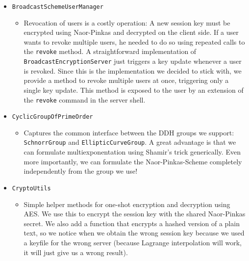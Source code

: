 \documentclass[a4paper,10pt]{scrartcl}
\begin{document}
\begin{itemize}
   \item \lstinline|BroadcastSchemeUserManager|
   \begin{itemize}
     \item Revocation of users is a costly operation: A new session key must be encrypted
     using Naor-Pinkas and decrypted on the client side. If a user wants to revoke multiple
     users, he needed to do so using repeated calls to the \lstinline|revoke| method.
     A straightforward implementation of \lstinline|BroadcastEncryptionServer| just triggers
     a key update whenever a user is revoked. Since this is the implementation we decided to
     stick with, we provide a method to revoke multiple users at once, triggering only
     a single key update. This method is exposed to the user by an extension of the \lstinline|revoke| command
     in the server shell.
  \end{itemize}

   \item \lstinline|CyclicGroupOfPrimeOrder|
  \begin{itemize}
    \item Captures the common interface between the DDH groups we support:
   \lstinline|SchnorrGroup| and \lstinline|EllipticCurveGroup|. A great advantage
   is that we can formulate multiexponentation using Shamir's trick generically. Even more importantly,
   we can formulate the Naor-Pinkas-Scheme completely independently from the group we use!
  \end{itemize}

   \item \lstinline|CryptoUtils|
  \begin{itemize}
   \item Simple helper methods for one-shot encryption and decryption using AES. We use this
   to encrypt the session key with the shared Naor-Pinkas secret. We also add a function that
   encrypts a hashed version of a plain text, so we notice when we obtain the wrong session
   key because we used a keyfile for the wrong server (because Lagrange interpolation will work,
   it will just give us a wrong result).
  \end{itemize}


\end{itemize}
\end{document}
